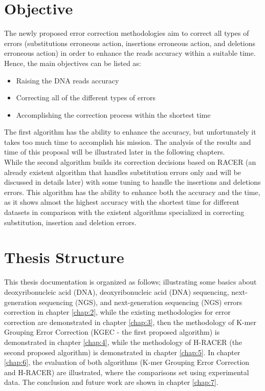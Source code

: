\documentclass[12pt,openany]{llncs}
\begin{document}
\section{Objective}
The newly proposed error correction methodologies aim to correct all types of errors (substitutions erroneous action, insertions erroneous action, and deletions erroneous action) in order to enhance the reads accuracy within a suitable time.
\\
Hence, the main objectives can be listed as:
\begin{itemize}
	\item Raising the DNA reads accuracy

	\item Correcting all of the different types of errors

	\item Accomplishing the correction process within the shortest time
\end{itemize}
The first algorithm has the ability to enhance the accuracy, but unfortunately it takes too much time to accomplish his mission. The analysis of the results and time of this proposal will be illustrated later in the following chapters. 
\\
While the second algorithm builds its correction decisions based on RACER \cite{Racer} (an already existent algorithm that handles substitution errors only and will be discussed in details later) with some tuning to handle the insertions and deletions errors. This algorithm has the ability to enhance both the accuracy and the time, as it shows almost the highest accuracy with the shortest time for different datasets in comparison with the existent algorithms specialized in correcting substitution, insertion and deletion errors.

\section{Thesis Structure}
This thesis documentation is organized as follows; illustrating some basics about deoxyribonucleic acid (DNA), deoxyribonucleic acid (DNA) sequencing, next-generation sequencing (NGS), and next-generation sequencing (NGS) errors correction in chapter \ref{chap:2}, while the  existing methodologies for error correction are demonstrated in chapter \ref{chap:3}, then the methodology of K-mer Grouping Error Correction (KGEC - the first proposed algorithm) is demonstrated in chapter \ref{chap:4}, while the methodology of H-RACER (the second proposed algorithm) is demonstrated in chapter \ref{chap:5}. In chapter \ref{chap:6}, the evaluation of both algorithms (K-mer Grouping Error Correction and H-RACER) are illustrated, where the comparisons set using experimental data. The conclusion and future work are shown in chapter \ref{chap:7}.
%
\end{document}
